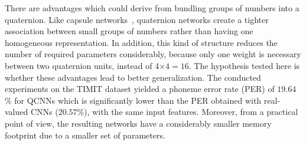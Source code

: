 \documentclass[a4paper]{article}
\begin{document}
There are advantages which could derive from bundling groups of numbers into a quaternion. Like capsule networks~\cite{hinton2017capsule}, quaternion networks create a tighter association between small groups of numbers rather than having one homogeneous representation. In addition, this kind of structure reduces the number of required parameters considerably, because only one weight is necessary between two quaternion units, instead of 4$\times 4=16$. The hypothesis tested here is whether these advantages lead to better generalization.
The conducted experiments on the TIMIT dataset yielded a phoneme error rate (PER) of $19.64$\% for QCNNs which is significantly lower than the PER obtained with real-valued CNNs ($20.57$\%), with the same input features. Moreover, from a practical point of view, the resulting networks have a considerably smaller memory footprint due to a smaller set of parameters.

 
\end{document}
